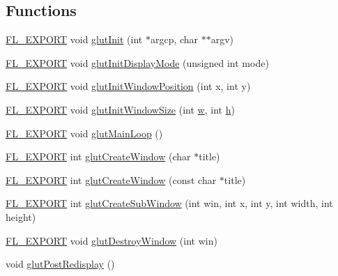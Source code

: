 \subsection*{Functions}
\begin{DoxyCompactItemize}
\item 
\hyperlink{_fl___export_8_h_aa9ba29a18aee9d738370a06eeb4470fc}{F\+L\+\_\+\+E\+X\+P\+O\+RT} void \hyperlink{glut_8_h_a1e1c50ec9c7000b5084857b6c01f54dc}{glut\+Init} (int $\ast$argcp, char $\ast$$\ast$argv)
\item 
\hyperlink{_fl___export_8_h_aa9ba29a18aee9d738370a06eeb4470fc}{F\+L\+\_\+\+E\+X\+P\+O\+RT} void \hyperlink{glut_8_h_a1da7b5179fa1ba1f94d389b1b2fd672e}{glut\+Init\+Display\+Mode} (unsigned int mode)
\item 
\hyperlink{_fl___export_8_h_aa9ba29a18aee9d738370a06eeb4470fc}{F\+L\+\_\+\+E\+X\+P\+O\+RT} void \hyperlink{glut_8_h_a00c38ea4cac5586ef20f10160fcc4653}{glut\+Init\+Window\+Position} (int x, int y)
\item 
\hyperlink{_fl___export_8_h_aa9ba29a18aee9d738370a06eeb4470fc}{F\+L\+\_\+\+E\+X\+P\+O\+RT} void \hyperlink{glut_8_h_a70c4c9eb10c0cce21d990b8966844724}{glut\+Init\+Window\+Size} (int \hyperlink{forms_8_h_aac374e320caaadeca4874add33b62af2}{w}, int \hyperlink{forms_8_h_a7e427ba5b307f9068129699250690066}{h})
\item 
\hyperlink{_fl___export_8_h_aa9ba29a18aee9d738370a06eeb4470fc}{F\+L\+\_\+\+E\+X\+P\+O\+RT} void \hyperlink{glut_8_h_a9a3f00b78e3eef3913ec1d454ddf14cf}{glut\+Main\+Loop} ()
\item 
\hyperlink{_fl___export_8_h_aa9ba29a18aee9d738370a06eeb4470fc}{F\+L\+\_\+\+E\+X\+P\+O\+RT} int \hyperlink{glut_8_h_a9b4aada0042db3918e9d2c2e25e46d3b}{glut\+Create\+Window} (char $\ast$title)
\item 
\hyperlink{_fl___export_8_h_aa9ba29a18aee9d738370a06eeb4470fc}{F\+L\+\_\+\+E\+X\+P\+O\+RT} int \hyperlink{glut_8_h_aecebbf280e28385f509ac981d4adae78}{glut\+Create\+Window} (const char $\ast$title)
\item 
\hyperlink{_fl___export_8_h_aa9ba29a18aee9d738370a06eeb4470fc}{F\+L\+\_\+\+E\+X\+P\+O\+RT} int \hyperlink{glut_8_h_a0cea2bd69dfa5bd25bd6c6d0d73762fe}{glut\+Create\+Sub\+Window} (int win, int x, int y, int width, int height)
\item 
\hyperlink{_fl___export_8_h_aa9ba29a18aee9d738370a06eeb4470fc}{F\+L\+\_\+\+E\+X\+P\+O\+RT} void \hyperlink{glut_8_h_ac353195af7c6ade49b91a3f8adb49e08}{glut\+Destroy\+Window} (int win)
\item 
void \hyperlink{glut_8_h_abdeec7ab56e4bbe848feefe0308d2bf6}{glut\+Post\+Redisplay} ()
$$
\end{DoxyCompactItemize}
